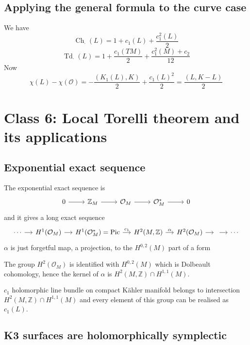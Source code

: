 \subsection{Applying the general formula to the curve case}

We have
\[\operatorname{Ch}_{\cdot}(L)=1+c_1(L)+\frac{c_1^2(L)}{2}\]
\[\operatorname{Td}_{\cdot}(L)=1+\frac{c_1(TM)}{2}+\frac{c_1^2(M)+c_2}{12}\]
Now
\[\chi(L)-\chi(\mathcal{O})=-\frac{(K_1(L),K)}{2}+\frac{c_1(L)^2}{2}=\frac{(L,K-L)}{2}\]





\section{Class 6: Local Torelli theorem and its applications}

\subsection{Exponential exact sequence}

The exponential exact sequence is
\[\begin{tikzcd}
	0\arrow[r]&\mathbb{Z}_M\arrow[r]&\mathcal{O}_M\arrow[r]&\mathcal{O}_M^*\arrow[r]&0
\end{tikzcd}\]
and it gives a long exact sequence
\[\begin{tikzcd}[column sep=small]
	\cdots\arrow[r]&H^{1}(\mathcal{O}_M)\arrow[r]&H^{1}(\mathcal{O}^*_M)=\operatorname{Pic}\arrow[r,"c_1"]&H^{2}(M,\mathbb{Z})\arrow[r,"\alpha"]&H^{2}(\mathcal{O}_M)\arrow[r]&\arrow[r]&\cdots
\end{tikzcd}\]
$\alpha$ is just forgetful map, a projection, to the  $H^{0,2}(M)$ part of a form

The group $H^{2}(\mathcal{O}_M)$ is identified with $H^{0,2}(M)$ which is Dolbeault cohomology, hence the kernel of $\alpha$ is $H^{2}(M,\mathbb{Z})\cap H^{1,1}(M)$.

\begin{prop}
	$c_1$ holomorphic line bundle on compact K\"ahler manifold belongs to intersection $H^{2}(M,\mathbb{Z})\cap H^{1,1}(M)$ and every element of this group can be realised as $c_1(L)$.
\end{prop}

\subsection{K3 surfaces are holomorphically symplectic}

